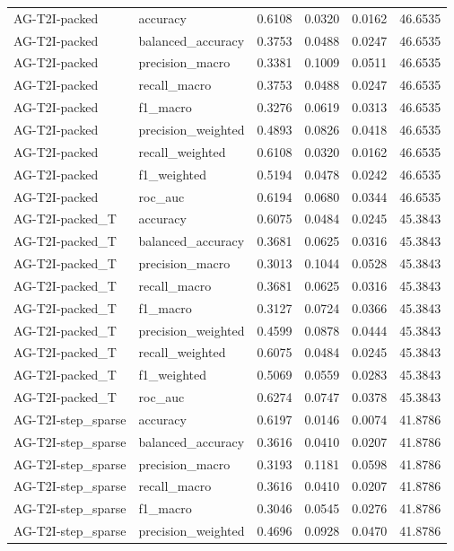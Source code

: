 \begin{tabular}{llrrrr}
AG-T2I-packed & accuracy & 0.6108 & 0.0320 & 0.0162 & 46.6535 \\
AG-T2I-packed & balanced_accuracy & 0.3753 & 0.0488 & 0.0247 & 46.6535 \\
AG-T2I-packed & precision_macro & 0.3381 & 0.1009 & 0.0511 & 46.6535 \\
AG-T2I-packed & recall_macro & 0.3753 & 0.0488 & 0.0247 & 46.6535 \\
AG-T2I-packed & f1_macro & 0.3276 & 0.0619 & 0.0313 & 46.6535 \\
AG-T2I-packed & precision_weighted & 0.4893 & 0.0826 & 0.0418 & 46.6535 \\
AG-T2I-packed & recall_weighted & 0.6108 & 0.0320 & 0.0162 & 46.6535 \\
AG-T2I-packed & f1_weighted & 0.5194 & 0.0478 & 0.0242 & 46.6535 \\
AG-T2I-packed & roc_auc & 0.6194 & 0.0680 & 0.0344 & 46.6535 \\
AG-T2I-packed_T & accuracy & 0.6075 & 0.0484 & 0.0245 & 45.3843 \\
AG-T2I-packed_T & balanced_accuracy & 0.3681 & 0.0625 & 0.0316 & 45.3843 \\
AG-T2I-packed_T & precision_macro & 0.3013 & 0.1044 & 0.0528 & 45.3843 \\
AG-T2I-packed_T & recall_macro & 0.3681 & 0.0625 & 0.0316 & 45.3843 \\
AG-T2I-packed_T & f1_macro & 0.3127 & 0.0724 & 0.0366 & 45.3843 \\
AG-T2I-packed_T & precision_weighted & 0.4599 & 0.0878 & 0.0444 & 45.3843 \\
AG-T2I-packed_T & recall_weighted & 0.6075 & 0.0484 & 0.0245 & 45.3843 \\
AG-T2I-packed_T & f1_weighted & 0.5069 & 0.0559 & 0.0283 & 45.3843 \\
AG-T2I-packed_T & roc_auc & 0.6274 & 0.0747 & 0.0378 & 45.3843 \\
AG-T2I-step_sparse & accuracy & 0.6197 & 0.0146 & 0.0074 & 41.8786 \\
AG-T2I-step_sparse & balanced_accuracy & 0.3616 & 0.0410 & 0.0207 & 41.8786 \\
AG-T2I-step_sparse & precision_macro & 0.3193 & 0.1181 & 0.0598 & 41.8786 \\
AG-T2I-step_sparse & recall_macro & 0.3616 & 0.0410 & 0.0207 & 41.8786 \\
AG-T2I-step_sparse & f1_macro & 0.3046 & 0.0545 & 0.0276 & 41.8786 \\
AG-T2I-step_sparse & precision_weighted & 0.4696 & 0.0928 & 0.0470 & 41.8786 \\

\end{tabular}
